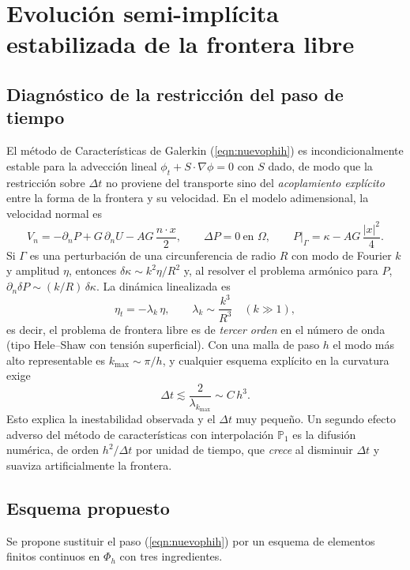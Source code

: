 \section{Evolución semi-implícita estabilizada de la frontera libre}
\label{sec:semiimplicito}

\subsection{Diagnóstico de la restricción del paso de tiempo}

El método de Características de Galerkin (\ref{eqn:nuevophih}) es incondicionalmente estable para la advección lineal $\phi_t+S\cdot\nabla\phi=0$ con $S$ dado, de modo que la restricción sobre $\Delta t$ no proviene del transporte sino del \emph{acoplamiento explícito} entre la forma de la frontera y su velocidad. En el modelo adimensional, la velocidad normal es
\[
V_n=-\partial_n P+G\,\partial_n U-AG\,\frac{n\cdot x}{2},\qquad \Delta P=0\ \text{en }\Omega,\qquad P|_\Gamma=\kappa-AG\,\frac{|x|^2}{4}.
\]
Si $\Gamma$ es una perturbación de una circunferencia de radio $R$ con modo de Fourier $k$ y amplitud $\eta$, entonces $\delta\kappa\sim k^2\eta/R^2$ y, al resolver el problema armónico para $P$, $\partial_n\delta P\sim (k/R)\,\delta\kappa$. La dinámica linealizada es
\[
\eta_t=-\lambda_k\,\eta,\qquad \lambda_k\sim \frac{k^3}{R^3}\quad (k\gg 1),
\]
es decir, el problema de frontera libre es de \emph{tercer orden} en el número de onda (tipo Hele--Shaw con tensión superficial). Con una malla de paso $h$ el modo más alto representable es $k_{\max}\sim\pi/h$, y cualquier esquema explícito en la curvatura exige
\[
\Delta t\lesssim \frac{2}{\lambda_{k_{\max}}}\sim C\,h^{3}.
\]
Esto explica la inestabilidad observada y el $\Delta t$ muy pequeño. Un segundo efecto adverso del método de características con interpolación $\mathbb{P}_1$ es la difusión numérica, de orden $h^2/\Delta t$ por unidad de tiempo, que \emph{crece} al disminuir $\Delta t$ y suaviza artificialmente la frontera.

\subsection{Esquema propuesto}

Se propone sustituir el paso (\ref{eqn:nuevophih}) por un esquema de elementos finitos continuos en $\Phi_h$ con tres ingredientes.

